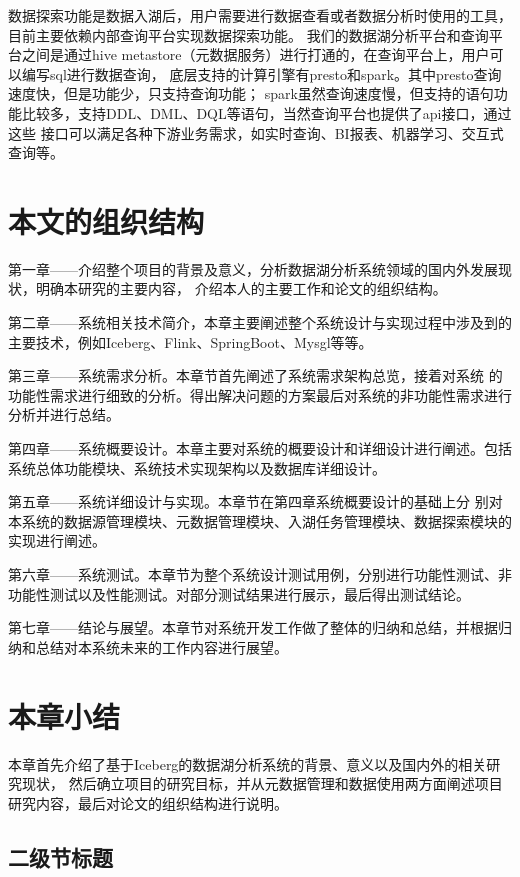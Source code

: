 数据探索功能是数据入湖后，用户需要进行数据查看或者数据分析时使用的工具，目前主要依赖内部查询平台实现数据探索功能。
我们的数据湖分析平台和查询平台之间是通过hive metastore（元数据服务）进行打通的，在查询平台上，用户可以编写sql进行数据查询，
底层支持的计算引擎有presto和spark。其中presto查询速度快，但是功能少，只支持查询功能；
spark虽然查询速度慢，但支持的语句功能比较多，支持DDL、DML、DQL等语句，当然查询平台也提供了api接口，通过这些
接口可以满足各种下游业务需求，如实时查询、BI报表、机器学习、交互式查询等。

\section{本文的组织结构}

第一章——介绍整个项目的背景及意义，分析数据湖分析系统领域的国内外发展现状，明确本研究的主要内容，
介绍本人的主要工作和论文的组织结构。

第二章——系统相关技术简介，本章主要阐述整个系统设计与实现过程中涉及到的主要技术，例如Iceberg、Flink、SpringBoot、Mysgl等等。

第三章——系统需求分析。本章节首先阐述了系统需求架构总览，接着对系统
的功能性需求进行细致的分析。得出解决问题的方案最后对系统的非功能性需求进行分析并进行总结。

第四章——系统概要设计。本章主要对系统的概要设计和详细设计进行阐述。包括系统总体功能模块、系统技术实现架构以及数据库详细设计。

第五章——系统详细设计与实现。本章节在第四章系统概要设计的基础上分
别对本系统的数据源管理模块、元数据管理模块、入湖任务管理模块、数据探索模块的实现进行阐述。

第六章——系统测试。本章节为整个系统设计测试用例，分别进行功能性测试、非功能性测试以及性能测试。对部分测试结果进行展示，最后得出测试结论。

第七章——结论与展望。本章节对系统开发工作做了整体的归纳和总结，并根据归纳和总结对本系统未来的工作内容进行展望。

\section{本章小结}

本章首先介绍了基于Iceberg的数据湖分析系统的背景、意义以及国内外的相关研究现状，
然后确立项目的研究目标，并从元数据管理和数据使用两方面阐述项目研究内容，最后对论文的组织结构进行说明。


\subsection{二级节标题}

